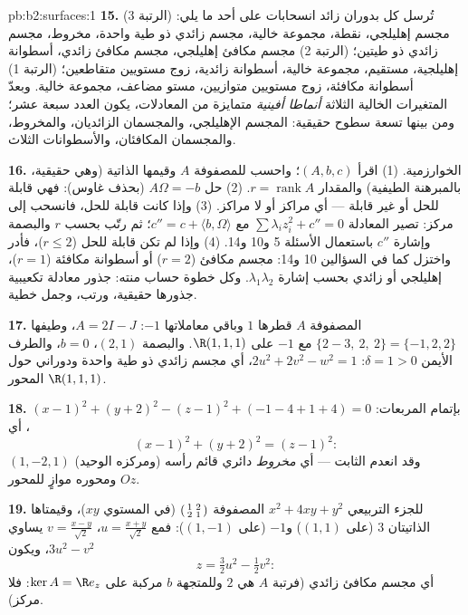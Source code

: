 \begin{solution}{pb:b2:surfaces:1}
\textbf{15.} تُرسل كل  بدوران زائد انسحابات على
أحد ما يلي: (الرتبة 3) مجسم إهليلجي، نقطة، مجموعة خالية، مجسم زائدي
ذو طية واحدة، مخروط، مجسم زائدي ذو طيتين؛ (الرتبة 2) مجسم مكافئ
إهليلجي، مجسم مكافئ زائدي، أسطوانة إهليلجية، مستقيم، مجموعة خالية،
أسطوانة زائدية، زوج مستويين متقاطعين؛ (الرتبة 1) أسطوانة مكافئة، زوج
مستويين متوازيين، مستو مضاعف، مجموعة خالية. وبعدّ المتغيرات الخالية
الثلاثة \emph{أنماطا أفينية} متمايزة من المعادلات، يكون العدد سبعة
عشر؛ ومن بينها تسعة سطوح حقيقية: المجسم الإهليلجي، والمجسمان
الزائديان، والمخروط، والمجسمان المكافئان، والأسطوانات الثلاث.

\textbf{16.} الخوارزمية. (1) اقرأ $(A, b, c)$؛ واحسب 
للمصفوفة $A$ وقيمها الذاتية (وهي حقيقية، بالمبرهنة الطيفية)
والمقدار $r = \operatorname{rank}A$. (2) حل $A\Omega = -b$ (بحذف غاوس): فهي قابلة للحل أو غير
قابلة --- أي مراكز أو لا مراكز. (3) وإذا كانت قابلة للحل، فانسحب إلى
مركز: تصير المعادلة $\sum\lambda_iz_i^2 + c'' = 0$ مع $c''
= c + \langle b, \Omega\rangle$؛ ثم رتّب بحسب $r$ والبصمة
وإشارة $c''$ باستعمال الأسئلة 5 و10 و14. (4) وإذا لم تكن قابلة
للحل ($r \leq 2$)، فأدر واختزل كما في السؤالين 10 و14: مجسم مكافئ
($r = 2$) أو أسطوانة مكافئة ($r = 1$)، إهليلجي أو زائدي بحسب إشارة
$\lambda_1\lambda_2$. وكل خطوة حساب منته: جذور معادلة تكعيبية جذورها حقيقية،
ورتب، وجمل خطية.

\textbf{17.} المصفوفة $A$ قطرها $1$ وباقي معاملاتها $-1$:
$A = 2I
- J$، وطيفها $\{2 - 3,\ 2,\ 2\} = \{-1, 2, 2\}$ مع $-1$ على $\R(1,1,1)$. والبصمة $(2,1)$،
$b = 0$، والطرف الأيمن $\delta = 1 > 0$: $2u^2 + 2v^2 - w^2 = 1$، أي مجسم زائدي ذو طية واحدة
ودوراني حول المحور $\R(1,1,1)$.

\textbf{18.} بإتمام المربعات: $(x-1)^2 + (y+2)^2 - (z-1)^2 +
(-1 - 4 + 1 + 4) = 0$، أي
\[
(x-1)^2 + (y+2)^2 = (z-1)^2 :
\]
وقد انعدم الثابت --- أي \emph{مخروط} دائري قائم رأسه (ومركزه الوحيد)
$(1, -2, 1)$ ومحوره موازٍ للمحور $Oz$.

\textbf{19.} للجزء التربيعي $x^2 + 4xy + y^2$ المصفوفة $\begin{psmallmatrix}1 & 2\\ 2 & 1\end{psmallmatrix}$ (في المستوي
$xy$)، وقيمتاها الذاتيتان $3$ (على $(1,1)$) و$-1$ (على
$(1,-1)$): فمع $u = \frac{x+y}{\sqrt2}$، $v =
\frac{x-y}{\sqrt2}$ يساوي $3u^2 - v^2$، ويكون 
\[
z = \tfrac32u^2 - \tfrac12v^2 :
\]
أي مجسم مكافئ زائدي (فرتبة $A$ هي $2$ وللمتجهة $b$ مركبة
على $\ker A = \R e_z$: فلا مركز).


\end{solution}

